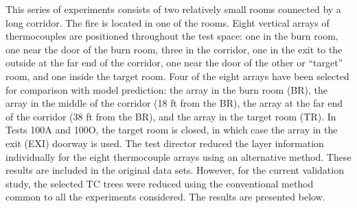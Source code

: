 This series of experiments consists of two relatively small rooms connected by a long corridor. The fire is located in one of the rooms.  Eight
vertical arrays of thermocouples are positioned throughout the test space: one in the burn room, one near the door of the burn room, three in the
corridor, one in the exit to the outside at the far end of the corridor, one near the door of the other or ``target'' room, and one inside the target
room.  Four of the eight arrays have been selected for comparison with model prediction: the array in the burn room (BR), the array in the middle of
the corridor (18 ft from the BR), the array at the far end of the corridor (38 ft from the BR), and the array in the target room (TR).  In Tests 100A
and 100O, the target room is closed, in which case the array in the exit (EXI) doorway is used. The test director reduced the layer information
individually for the eight thermocouple arrays using an alternative method. These results are included in the original data sets. However, for the
current validation study, the selected TC trees were reduced using the conventional method common to all the experiments considered.  The results are
presented below.


